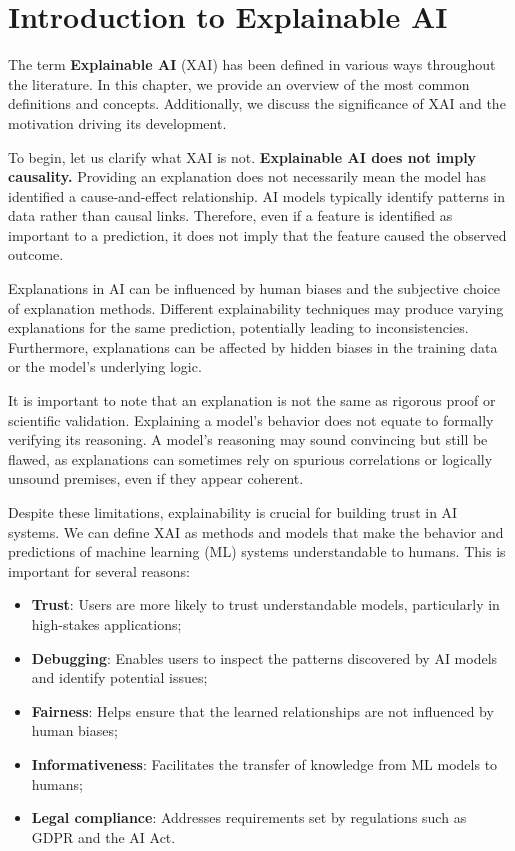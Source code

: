 \chapter{Introduction to Explainable AI}
The term \textbf{Explainable AI} (XAI) has been defined in various ways throughout
the literature. In this chapter, we provide an overview of the most common
definitions and concepts. Additionally, we discuss the significance of XAI and
the motivation driving its development.

To begin, let us clarify what XAI is not. \textbf{Explainable AI does not imply
    causality.} Providing an explanation does not necessarily mean the model has
identified a cause-and-effect relationship. AI models typically identify patterns
in data rather than causal links. Therefore, even if a feature is identified as
important to a prediction, it does not imply that the feature caused the observed
outcome.

Explanations in AI can be influenced by human biases and the subjective choice
of explanation methods. Different explainability techniques may produce varying
explanations for the same prediction, potentially leading to inconsistencies.
Furthermore, explanations can be affected by hidden biases in the training data
or the model's underlying logic.

It is important to note that an explanation is not the same as rigorous proof or
scientific validation. Explaining a model's behavior does not equate to formally
verifying its reasoning. A model's reasoning may sound convincing but still be
flawed, as explanations can sometimes rely on spurious correlations or logically
unsound premises, even if they appear coherent.

Despite these limitations, explainability is crucial for building trust in AI
systems. We can define XAI as methods and models that make the behavior and
predictions of machine learning (ML) systems understandable to humans. This is
important for several reasons:

\begin{itemize}
    \item \textbf{Trust}: Users are more likely to trust understandable models,
          particularly in high-stakes applications;
    \item \textbf{Debugging}: Enables users to inspect the patterns discovered
          by AI models and identify potential issues;
    \item \textbf{Fairness}: Helps ensure that the learned relationships are not
          influenced by human biases;
    \item \textbf{Informativeness}: Facilitates the transfer of knowledge from ML
          models to humans;
    \item \textbf{Legal compliance}: Addresses requirements set by regulations
          such as GDPR and the AI Act.
\end{itemize}

